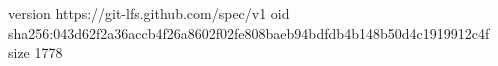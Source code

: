 version https://git-lfs.github.com/spec/v1
oid sha256:043d62f2a36accb4f26a8602f02fe808baeb94bdfdb4b148b50d4c1919912c4f
size 1778
